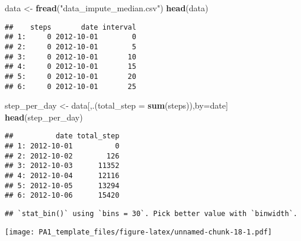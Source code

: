 \documentclass[
]{article}
\newenvironment{Shaded}{\begin{snugshade}}{\end{snugshade}}
\newcommand{\CommentTok}[1]{\textcolor[rgb]{0.56,0.35,0.01}{\textit{#1}}}
\newcommand{\DataTypeTok}[1]{\textcolor[rgb]{0.13,0.29,0.53}{#1}}
\newcommand{\KeywordTok}[1]{\textcolor[rgb]{0.13,0.29,0.53}{\textbf{#1}}}
\newcommand{\NormalTok}[1]{#1}
\newcommand{\OperatorTok}[1]{\textcolor[rgb]{0.81,0.36,0.00}{\textbf{#1}}}
\newcommand{\StringTok}[1]{\textcolor[rgb]{0.31,0.60,0.02}{#1}}
\begin{document}
\begin{Shaded}
\begin{Highlighting}[]
\NormalTok{data <-}\StringTok{ }\KeywordTok{fread}\NormalTok{(}\StringTok{"data_impute_median.csv"}\NormalTok{)}
\KeywordTok{head}\NormalTok{(data)}
\end{Highlighting}
\end{Shaded}

\begin{verbatim}
##    steps       date interval
## 1:     0 2012-10-01        0
## 2:     0 2012-10-01        5
## 3:     0 2012-10-01       10
## 4:     0 2012-10-01       15
## 5:     0 2012-10-01       20
## 6:     0 2012-10-01       25
\end{verbatim}

\begin{Shaded}
\begin{Highlighting}[]
\NormalTok{step_per_day <-}\StringTok{ }\NormalTok{data[,.(}\DataTypeTok{total_step =} \KeywordTok{sum}\NormalTok{(steps)),by=date]}
\KeywordTok{head}\NormalTok{(step_per_day)}
\end{Highlighting}
\end{Shaded}

\begin{verbatim}
##          date total_step
## 1: 2012-10-01          0
## 2: 2012-10-02        126
## 3: 2012-10-03      11352
## 4: 2012-10-04      12116
## 5: 2012-10-05      13294
## 6: 2012-10-06      15420
\end{verbatim}

\begin{Shaded}
\end{Shaded}

\begin{verbatim}
## `stat_bin()` using `bins = 30`. Pick better value with `binwidth`.
\end{verbatim}

\texttt{[image: PA1\_template\_files/figure-latex/unnamed-chunk-18-1.pdf]}
\end{document}
